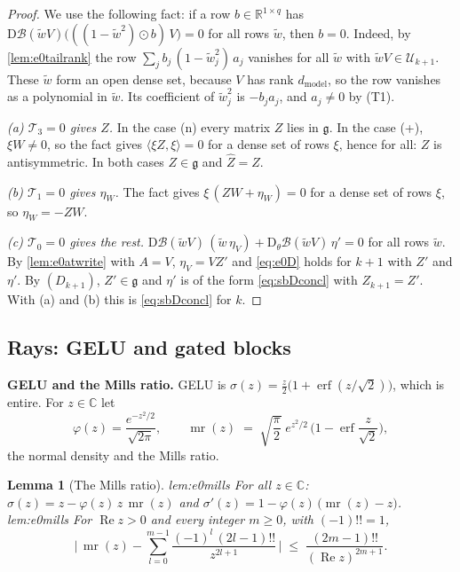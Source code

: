 \documentclass[10pt]{article}
\newtheorem{lemma}[theorem]{Lemma}
\theoremstyle{definition}
\theoremstyle{remark}
\newcommand{\R}{\mathbb{R}}
\newcommand{\dm}{d_{\mathrm{model}}}
\newcommand{\Der}{\mathrm{D}}
\newcommand{\para}[1]{\smallskip\noindent\textbf{#1}\hspace{0.5em}}
\newcommand{\ptlabel}[1]{\phantomsection\label{#1}}
\newcommand{\stpart}[3]{\ifx\relax#1\relax\else\ptlabel{#1:#2}\fi{\upshape\bfseries\boldmath(#2)\ifx\relax#3\relax\else\ #3.\fi}}
\begin{document}
\begin{proof}
We use the following fact: if a row $b \in \R^{1\times q}$ has $\Der\mathcal B(\tilde wV)\big(((1 - \tilde w^2)\odot b)\,V\big) = 0$ for all rows $\tilde w$, then $b = 0$. Indeed, by \cref{lem:e0tailrank} the row $\sum_j b_j\,(1 - \tilde w_j^2)\,a_j$ vanishes for all $\tilde w$ with $\tilde wV \in \mathcal U_{k+1}$. These $\tilde w$ form an open dense set, because $V$ has rank $\dm$, so the row vanishes as a polynomial in $\tilde w$. Its coefficient of $\tilde w_j^2$ is $-b_ja_j$, and $a_j \neq 0$ by (T1).

\emph{(a) $\mathcal T_3 = 0$ gives $Z$.} In the case (n) every matrix $Z$ lies in $\mathfrak g$. In the case (+), $\xi W \neq 0$, so the fact gives $\langle\xi Z, \xi\rangle = 0$ for a dense set of rows $\xi$, hence for all: $Z$ is antisymmetric. In both cases $Z \in \mathfrak g$ and $\widehat Z = Z$.

\emph{(b) $\mathcal T_1 = 0$ gives $\eta_W$.} The fact gives $\xi\,(ZW + \eta_W) = 0$ for a dense set of rows $\xi$, so $\eta_W = -ZW$.

\emph{(c) $\mathcal T_0 = 0$ gives the rest.} $\Der\mathcal B(\tilde wV)\,(\tilde w\,\eta_V) + \Der_\theta\mathcal B(\tilde wV)\,\eta' = 0$ for all rows $\tilde w$. By \cref{lem:e0atwrite} with $A = V$, $\eta_V = VZ'$ and \eqref{eq:e0D} holds for $k+1$ with $Z'$ and $\eta'$. By $(D_{k+1})$, $Z' \in \mathfrak g$ and $\eta'$ is of the form \eqref{eq:sbDconcl} with $Z_{k+1} = Z'$. With (a) and (b) this is \eqref{eq:sbDconcl} for $k$.
\end{proof}

\subsection{Rays: GELU and gated blocks}\label{app:raysgelu}

\para{GELU and the Mills ratio.} GELU is $\sigma(z) = \frac z2\big(1 + \operatorname{erf}(z/\sqrt2)\big)$, which is entire. For $z \in \mathbb C$ let
\[
\varphi(z) = \frac{e^{-z^2/2}}{\sqrt{2\pi}}, \qquad \operatorname{mr}(z) \;=\; \sqrt{\frac{\pi}{2}}\;e^{z^2/2}\,\Big(1 - \operatorname{erf}\frac{z}{\sqrt2}\Big),
\]
the normal density and the Mills ratio.

\begin{lemma}[The Mills ratio]\label{lem:e0mills}
\stpart{lem:e0mills}{i}{} For all $z \in \mathbb C$: $\sigma(z) = z - \varphi(z)\,z\,\operatorname{mr}(z)$ and $\sigma'(z) = 1 - \varphi(z)\,\big(\operatorname{mr}(z) - z\big)$.\\
\stpart{lem:e0mills}{ii}{} For $\operatorname{Re}z > 0$ and every integer $m \ge 0$, with $(-1)!! = 1$,
\[
\Big\lvert\,\operatorname{mr}(z) - \sum_{l=0}^{m-1}\frac{(-1)^l\,(2l-1)!!}{z^{2l+1}}\,\Big\rvert \;\le\; \frac{(2m-1)!!}{(\operatorname{Re}z)^{2m+1}} .
\]
\end{lemma}
\end{document}
